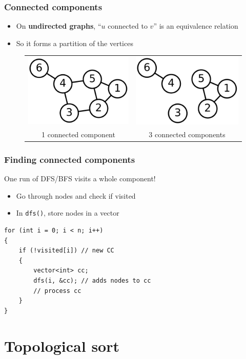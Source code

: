 \documentclass[12pt]{beamer}
\begin{document}
\begin{frame}
\frametitle{Connected components}
\begin{itemize}
\item On \textbf{undirected graphs}, ``$u$ connected to $v$'' is an equivalence relation
\item So it forms a partition of the vertices
\end{itemize}
\begin{figure}
\centering
\begin{tabular}{cc}
\includegraphics[width=0.4\linewidth]{img/6n-graph}
& \includegraphics[width=0.4\linewidth]{img/6n-3comp} \\
1 connected component & 3 connected components
\end{tabular}
\end{figure}
\end{frame}

\begin{frame}[fragile]
\frametitle{Finding connected components}
One run of DFS/BFS visits a whole component!
\begin{itemize}
\item Go through nodes and check if visited
\item In \texttt{dfs()}, store nodes in a vector
\end{itemize}
\begin{lstlisting}
for (int i = 0; i < n; i++)
{
    if (!visited[i]) // new CC
    {
        vector<int> cc;
        dfs(i, &cc); // adds nodes to cc
        // process cc
    }
}
\end{lstlisting}
\end{frame}

\section{Topological sort}
\end{document}

